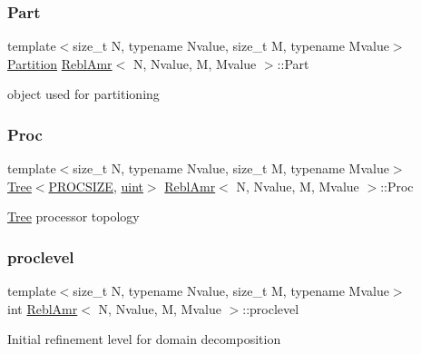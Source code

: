 \subsubsection{\texorpdfstring{Part}{Part}}
{\footnotesize\ttfamily template$<$size\+\_\+t N, typename Nvalue, size\+\_\+t M, typename Mvalue$>$ \\
\mbox{\hyperlink{classPartition}{Partition}} \mbox{\hyperlink{classReblAmr}{Rebl\+Amr}}$<$ N, Nvalue, M, Mvalue $>$\+::Part\hspace{0.3cm}{\ttfamily [private]}}

object used for partitioning \mbox{\label{classReblAmr_af59560765779ccba3b9722e2edfb0ae5}} 
\subsubsection{\texorpdfstring{Proc}{Proc}}
{\footnotesize\ttfamily template$<$size\+\_\+t N, typename Nvalue, size\+\_\+t M, typename Mvalue$>$ \\
\mbox{\hyperlink{classTree}{Tree}}$<$\mbox{\hyperlink{params_8h_a869e77c8856c40dc7369197ee4ee8059ab3d1097d7132ac8b8c33439eb2e7c02f}{P\+R\+O\+C\+S\+I\+ZE}}, \mbox{\hyperlink{definitions_8h_a69aa29b598b851b0640aa225a9e5d61d}{uint}}$>$ \mbox{\hyperlink{classReblAmr}{Rebl\+Amr}}$<$ N, Nvalue, M, Mvalue $>$\+::Proc\hspace{0.3cm}{\ttfamily [private]}}

\mbox{\hyperlink{classTree}{Tree}} processor topology \mbox{\label{classReblAmr_a5297343e897b4590989cec2d14895586}} 
\subsubsection{\texorpdfstring{proclevel}{proclevel}}
{\footnotesize\ttfamily template$<$size\+\_\+t N, typename Nvalue, size\+\_\+t M, typename Mvalue$>$ \\
int \mbox{\hyperlink{classReblAmr}{Rebl\+Amr}}$<$ N, Nvalue, M, Mvalue $>$\+::proclevel\hspace{0.3cm}{\ttfamily [private]}}

Initial refinement level for domain decomposition \mbox{\label{classReblAmr_abadf47bfc4c8453e3f9633df36e81ada}} 
